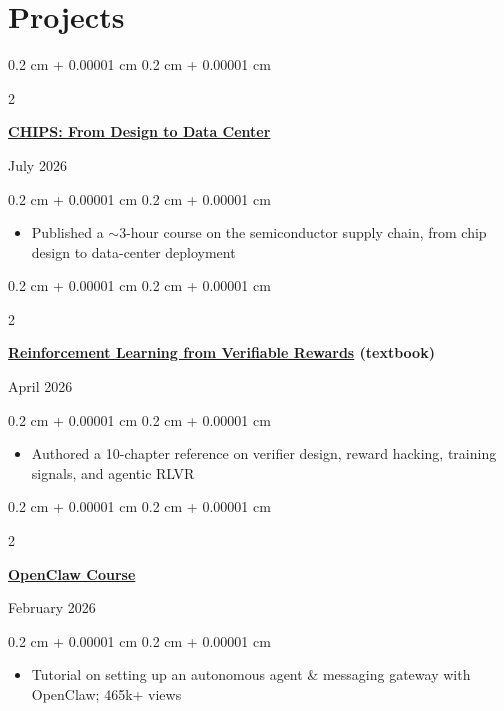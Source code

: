 \documentclass[10pt, letterpaper]{article}
\newenvironment{highlights}{
    \begin{itemize}[
        topsep=0.09 cm,
        parsep=0.09 cm,
        partopsep=0pt,
        itemsep=0pt,
        leftmargin=0.4 cm + 10pt
    ]
}{
    \end{itemize}
}
\newenvironment{onecolentry}{
    \begin{adjustwidth}{
        0.2 cm + 0.00001 cm
    }{
        0.2 cm + 0.00001 cm
    }
}{
    \end{adjustwidth}
}
\newenvironment{twocolentry}[2][]{
    \begin{adjustwidth}{
        0.2 cm + 0.00001 cm
    }{
        0.2 cm + 0.00001 cm
    }
    \def\secondColumn{#2}
    \setcolumnwidth{\fill, 5.2 cm}
    \begin{paracol}{2}
}{
    \switchcolumn \raggedleft \secondColumn
    \end{paracol}
    \end{adjustwidth}
}
\let\hrefWithoutArrow\href
\renewcommand{\href}[2]{\hrefWithoutArrow{#1}{#2}}
\begin{document}
        \vspace{0.09 cm}

    \section{Projects}
        \begin{twocolentry}{July 2026}
            \textbf{\href{https://www.youtube.com/watch?v=FGT7LZbZe-g}{CHIPS: From Design to Data Center}}
        \end{twocolentry}

        \vspace{0.09 cm}
        \begin{onecolentry}
            \begin{highlights}
                \item Published a $\sim$3-hour course on the semiconductor supply chain, from chip design to data-center deployment
            \end{highlights}
        \end{onecolentry}

        \begin{twocolentry}{April 2026}
            \textbf{\href{https://rlvrbook.com}{Reinforcement Learning from Verifiable Rewards} (textbook)}
        \end{twocolentry}

        \vspace{0.09 cm}
        \begin{onecolentry}
            \begin{highlights}
                \item Authored a 10-chapter reference on verifier design, reward hacking, training signals, and agentic RLVR
            \end{highlights}
        \end{onecolentry}

        \vspace{0.09 cm}

        \begin{twocolentry}{February 2026}
            \textbf{\href{https://www.youtube.com/watch?v=n1sfrc-RjyM}{OpenClaw Course}}
        \end{twocolentry}

        \vspace{0.09 cm}
        \begin{onecolentry}
            \begin{highlights}
                \item Tutorial on setting up an autonomous agent \& messaging gateway with OpenClaw; 465k+ views
            \end{highlights}
        \end{onecolentry}
\end{document}
